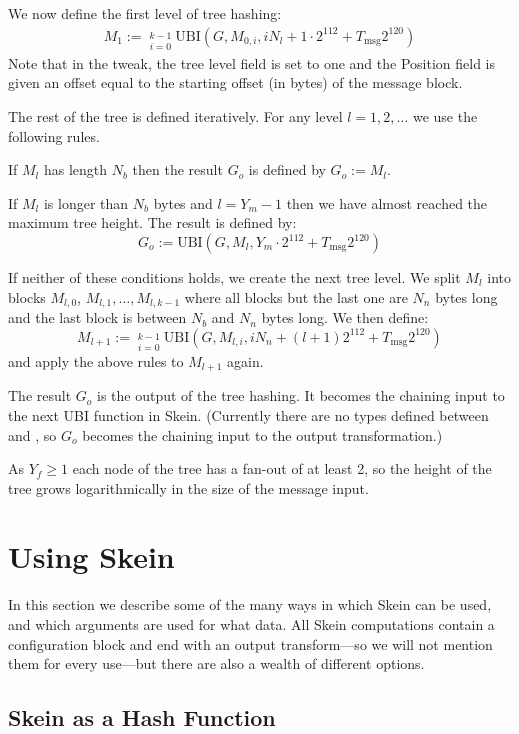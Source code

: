 \documentclass[11pt,twoside]{article}
\newcommand{\UBI}{\text{UBI}}
\newcommand{\TypeSymbol}[1]{\text{$T_\text{#1}$}\xspace}
\newcommand{\TypeMsg}{\TypeSymbol{msg}}
\newcommand{\TypeOut}{\TypeSymbol{out}}
\begin{document}
We now define the first level of tree hashing:
\begin{align*}
M_1 := \mathop{\Big|\Big|}\limits_{i=0}^{k-1} \UBI( G, M_{0,i}, iN_l + 1 \cdot 2^{112} + \TypeMsg 2^{120} )
\end{align*}
Note that in the tweak, the tree level field is set to one and the Position field is given an offset equal to the starting offset (in bytes) of the message block.

The rest of the tree is defined iteratively. For any level $l =1, 2, \ldots $ we use the following rules.

If $M_l$ has length $N_b$ then the result $G_o$ is defined by $G_o := M_l$.

If $M_l$ is longer than $N_b$ bytes and $l = Y_m - 1$ then we have almost reached the maximum tree height. The result is defined by: \[
G_o := \UBI( G, M_l, Y_m \cdot 2^{112} + \TypeMsg 2^{120} )
\]

If neither of these conditions holds, we create the next tree level. We split $M_l$ into blocks $M_{l,0}$, $M_{l,1}, \ldots, M_{l,k-1}$ where all blocks but the last one are $N_n$ bytes long and the last block is between $N_b$ and $N_n$ bytes long. We then define:
\[
M_{l+1} := \mathop{\Big|\Big|}\limits_{i=0}^{k-1} \UBI( G, M_{l,i}, iN_n + (l+1) 2^{112} + \TypeMsg 2^{120} )
\]
and apply the above rules to $M_{l+1}$ again.

The result $G_o$ is the output of the tree hashing. It becomes the chaining input to the next UBI function in Skein. (Currently there are no types defined between \TypeMsg and \TypeOut, so $G_o$ becomes the chaining input to the output transformation.)

As $Y_f \geq 1$ each node of the tree has a fan-out of at least 2, so the height of the tree grows logarithmically in the size of the message input.

\section{Using Skein}\label{sec:using}

In this section we describe some of the many ways in which Skein can be used, and which arguments are used for what data.  All Skein computations contain a configuration block and end with an output transform---so we will not mention them for every use---but there are also a wealth of different options.

\subsection{Skein as a Hash Function}
\end{document}
